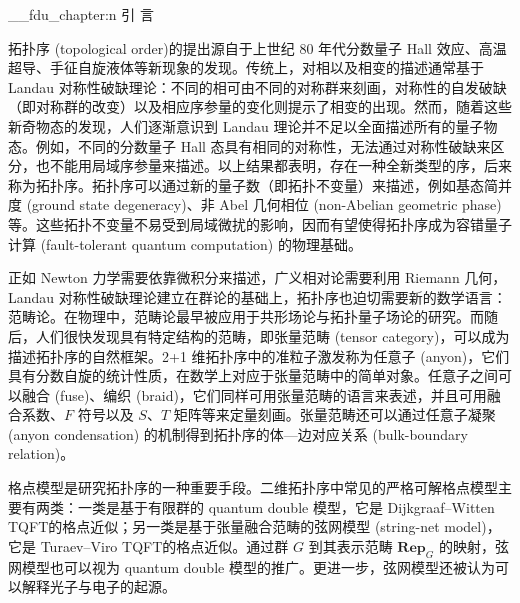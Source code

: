 \ExplSyntaxOn
\__fdu_chapter:n { 引 \quad 言 }
\ExplSyntaxOff

拓扑序 (topological order)\cite{wen1990topological,wen2013topological,wen2017colloquium,zeng2019introduction}的提出源自于上世纪 80 年代分数量子 Hall 效应\cite{tsui1982two,laughlin1983anomalous}、高温超导、手征自旋液体\cite{kalmeyer1987equivalence,wen1989chiral}等新现象的发现。传统上，对相以及相变的描述通常基于 Landau 对称性破缺理论：不同的相可由不同的对称群来刻画，对称性的自发破缺（即对称群的改变）以及相应序参量的变化则提示了相变的出现\cite{landau1980statistical,pathria2011statistical}。然而，随着这些新奇物态的发现，人们逐渐意识到 Landau 理论并不足以全面描述所有的量子物态。例如，不同的分数量子 Hall 态具有相同的对称性，无法通过对称性破缺来区分，也不能用局域序参量来描述\cite{stone1992quantum}。以上结果都表明，存在一种全新类型的序，后来称为拓扑序。拓扑序可以通过新的量子数（即拓扑不变量）来描述，例如基态简并度 (ground state degeneracy)\cite{wen1989vacuum,wen1990ground}、非 Abel 几何相位 (non-Abelian geometric phase)\cite{wen1990topological}等。这些拓扑不变量不易受到局域微扰的影响，因而有望使得拓扑序成为容错量子计算 (fault-tolerant quantum computation) 的物理基础\cite{kitaev2003fault,freedman2003topological,nayak2008nonabelian}。

正如 Newton 力学需要依靠微积分来描述，广义相对论需要利用 Riemann 几何，Landau 对称性破缺理论建立在群论的基础上，拓扑序也迫切需要新的数学语言：范畴论。在物理中，范畴论最早被应用于共形场论\cite{segal1988definition,moore1989classical}与拓扑量子场论\cite{atiyah1988topological,turaev1992state}的研究。而随后，人们很快发现具有特定结构的范畴，即张量范畴 (tensor category)，可以成为描述拓扑序的自然框架\cite{levin2005string,kitaev2006anyons}。2+1 维拓扑序中的准粒子激发称为任意子 (anyon)，它们具有分数自旋的统计性质，在数学上对应于张量范畴中的简单对象。任意子之间可以融合 (fuse)、编织 (braid)，它们同样可用张量范畴的语言来表述，并且可用融合系数、$F$ 符号以及 $S$、$T$ 矩阵等来定量刻画\cite{bakalov2001lectures,kitaev2006anyons,bruillard2016rank,aasen2020topological}。张量范畴还可以通过任意子凝聚 (anyon condensation) 的机制得到拓扑序的体—边对应关系 (bulk-boundary relation)\cite{kong2014anyon,kong2014braided,kong2015boundary,kong2017boundary,lou2021dummy}。

格点模型是研究拓扑序的一种重要手段。二维拓扑序中常见的严格可解格点模型主要有两类：一类是基于有限群的 quantum double 模型\cite{kitaev2003fault,kitaev2006anyons}，它是 Dijkgraaf--Witten TQFT\cite{dijkgraaf1990topological}的格点近似；另一类是基于张量融合范畴的弦网模型 (string-net model)\cite{levin2005string}，它是 Turaev--Viro TQFT\cite{turaev1992state,kirillov2011string}的格点近似。通过群 $G$ 到其表示范畴 $\mathbf{Rep}_G$ 的映射，弦网模型也可以视为 quantum double 模型的推广\cite{buerschaper2009mapping,buerschaper2013electric}。更进一步，弦网模型还被认为可以解释光子与电子的起源\cite{levin2005colloquium}。

